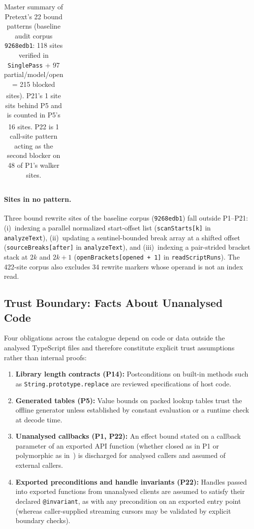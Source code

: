 \documentclass[10pt,a4paper]{article}
\newcommand{\code}[1]{\textcolor{codec}{\texttt{#1}}}
\newcommand{\lean}[1]{\texttt{\small #1}}
\renewcommand{\lean}[1]{\textcolor{leanc}{\texttt{\small #1}}}%
\begin{document}
\begin{table}[!htbp]
\begin{tabularx}{\textwidth}{@{}l r >{\raggedright\arraybackslash}p{} >{\raggedright\arraybackslash}X@{}}
\bottomrule
\end{tabularx}
\caption{Master summary of Pretext's 22 bound patterns (baseline audit corpus \code{9268edb1}: 118 sites verified in \lean{SinglePass} + 97 partial/model/open = 215 blocked sites). \textsuperscript{\ddag}P21's 1 site sits behind P5 and is counted in P5's 16 sites. \textsuperscript{\dag}P22 is 1 call-site pattern acting as the second blocker on 48 of P1's walker sites.}\label{tab:summary}
\end{table}

\paragraph{Sites in no pattern.}
Three bound rewrite sites of the baseline corpus (\code{9268edb1}) fall
outside P1--P21:
(i)~indexing a parallel normalized start-offset list
(\code{scanStarts[k]} in \code{analyzeText}),
(ii)~updating a sentinel-bounded break array at a shifted offset
(\code{sourceBreaks[after]} in \code{analyzeText}), and
(iii)~indexing a pair-strided bracket stack at $2k$ and $2k+1$
(\code{openBrackets[opened + 1]} in \code{readScriptRuns}).
The 422-site corpus also excludes 34 rewrite markers whose operand is
not an index read.

\FloatBarrier
\subsection{Trust Boundary: Facts About Unanalysed Code}\label{sec:trust}

Four obligations across the catalogue depend on code or data outside the
analysed TypeScript files and therefore constitute explicit trust
assumptions rather than internal proofs:
\begin{enumerate}[leftmargin=1.5em,itemsep=2pt]
\item \textbf{Library length contracts (P14):} Postconditions on
  built-in methods such as \code{String.prototype.replace} are reviewed
  specifications of host code.
\item \textbf{Generated tables (P5):} Value bounds on packed lookup
  tables trust the offline generator unless established by constant
  evaluation or a runtime check at decode time.
\item \textbf{Unanalysed callbacks (P1, P22):} An effect bound stated on
  a callback parameter of an exported API function (whether closed as in
  P1 or polymorphic as in~\cite{el}) is discharged for analysed callers
  and assumed of external callers.
\item \textbf{Exported preconditions and handle invariants (P22):}
  Handles passed into exported functions from unanalysed clients are
  assumed to satisfy their declared \code{@invariant}, as with any
  precondition on an exported entry point (whereas caller-supplied
  streaming cursors may be validated by explicit boundary checks).
\end{enumerate}
\end{document}
